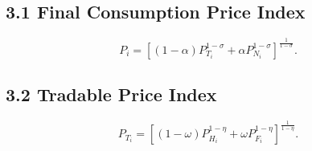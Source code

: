 \documentclass[11pt]{article}
\begin{document}
\subsection*{3.1 Final Consumption Price Index}

\[
P_{i}=\left[ (1-\alpha )P_{T_{i}}^{1-\sigma }+\alpha P_{N_{i}}^{1-\sigma }%
\right] ^{\frac{1}{1-\sigma }}. 
\]

\subsection*{3.2 Tradable Price Index}

\[
P_{T_{i}}=\left[ (1-\omega )P_{H_{i}}^{1-\eta }+\omega P_{F_{i}}^{1-\eta }%
\right] ^{\frac{1}{1-\eta }}. 
\]
\end{document}
